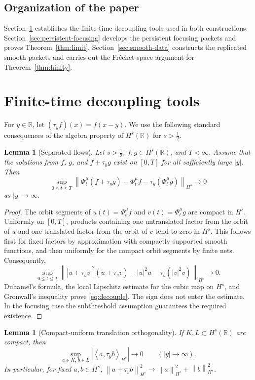 \documentclass[11pt,reqno]{amsart}
\numberwithin{equation}{section}
\newtheorem{lemma}[theorem]{Lemma}
\theoremstyle{remark}
\newcommand{\R}{\mathbb R}
\newcommand{\half}{\frac12}
\newcommand{\norm}[1]{\left\lVert #1\right\rVert}
\newcommand{\abs}[1]{\left\lvert #1\right\rvert}
\newcommand{\ip}[2]{\left\langle #1,#2\right\rangle}
\newcommand{\flow}[1]{\Phi^{#1}}
\newcommand{\trans}[1]{\tau_{#1}}
\begin{document}
\subsection{Organization of the paper}
Section~\ref{sec:decoupling} establishes the finite-time decoupling tools used
in both constructions.  Section~\ref{sec:persistent-focusing} develops the
persistent focusing packets and proves Theorem~\ref{thm:limit}.
Section~\ref{sec:smooth-data} constructs the replicated smooth packets and
carries out the Fr\'echet-space argument for Theorem~\ref{thm:hinfty}.


\section{Finite-time decoupling tools}\label{sec:decoupling}

For $y\in\R$, let $(\trans yf)(x)=f(x-y)$.  We use the following standard
consequences of the algebra property of $H^s(\R)$ for $s>\half$.

\begin{lemma}[Separated flows]\label{lem:decouple}
Let $s>\half$, $f,g\in H^s(\R)$, and $T<\infty$.  Assume that the solutions
from $f$, $g$, and $f+\trans yg$ exist on $[0,T]$ for all sufficiently large
$|y|$.  Then
\begin{equation}\label{eq:decouple}
 \sup_{0\leq t\leq T}
 \norm{\flow\mu_t(f+\trans yg)-\flow\mu_tf-
 \trans y(\flow\mu_tg)}_{H^s}\longrightarrow0
\end{equation}
as $|y|\to\infty$.
\end{lemma}

\begin{proof}
The orbit segments of $u(t)=\flow\mu_tf$ and $v(t)=\flow\mu_tg$ are compact
in $H^s$.  Uniformly on $[0,T]$, products containing one untranslated factor
from the orbit of $u$ and one translated factor from the orbit of $v$ tend to
zero in $H^s$.  This follows first for fixed factors by approximation with
compactly supported smooth functions, and then uniformly for the compact
orbit segments by finite nets.  Consequently,
\[
 \sup_{0\leq t\leq T}
 \norm{|u+\trans yv|^2(u+\trans yv)-|u|^2u-
 \trans y(|v|^2v)}_{H^s}\longrightarrow0.
\]
Duhamel's formula, the local Lipschitz estimate for the cubic map on $H^s$,
and Gronwall's inequality prove \eqref{eq:decouple}.  The sign does not enter
the estimate.  In the focusing case the subthreshold assumption guarantees
the required existence.
\end{proof}

\begin{lemma}[Compact-uniform translation orthogonality]\label{lem:orthog}
If $K,L\subset H^s(\R)$ are compact, then
\begin{equation}\label{eq:orthog}
 \sup_{a\in K,\,b\in L}
 \abs{\ip a{\trans yb}_{H^s}}\longrightarrow0
 \qquad (|y|\to\infty).
\end{equation}
In particular, for fixed $a,b\in H^s$,
$\norm{a+\trans yb}_{H^s}^2\to\norm a_{H^s}^2+\norm b_{H^s}^2$.
\end{lemma}
\end{document}
